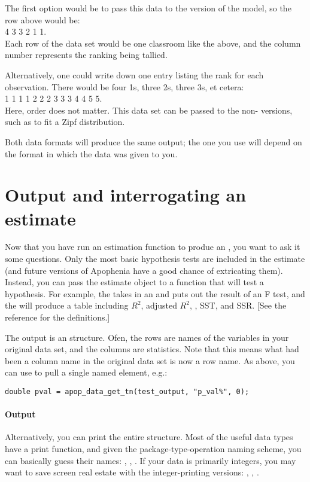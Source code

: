 The first option would be to pass this data to
the  version of the model, so the row above would be:\\
4 3 3 2 1 1.\\
Each row of the data set would be one classroom like the above, and the
column number represents the ranking being tallied.

Alternatively, one could 
write down one entry listing the rank for each observation. There would
be four 1s, three 2s, three 3s, et cetera:\\
1 1 1 1 2 2 2 3 3 3 4 4 5 5.\\
Here, order does not matter.  This data set can be passed to the
non- versions, such as  to fit a
Zipf distribution.

Both data formats will produce the same output; the one you use will
depend on the format in which the data was given to you.




\section{Output and interrogating an estimate}  \label{testoutput}
Now that you have run an estimation function to produe an 
, you want to ask it some questions. Only the most
basic hypothesis tests are included in the estimate (and future versions
of Apophenia have a good chance of extricating them). Instead, you can
pass the estimate object to a function that will test a hypothesis. For
example, the  takes in an 
 and puts out the result of an F test, and the
 will produce a
table including $R^2$, adjusted $R^2$, , SST, and SSR. [See the
reference for the definitions.] 

The output is an  structure. Ofen, the rows are
names of the variables in your original data set, and the columns are
statistics. Note that this means what had been a column name in the 
original data set is now a row name. As above, you can use 
 to pull a single named element, e.g.:
\begin{lstlisting}
double pval = apop_data_get_tn(test_output, "p_val%", 0);
\end{lstlisting}

\paragraph{Output} 
Alternatively, you can print the entire   structure.
Most of the useful data types have
a print function, and given the package-type-operation naming scheme,
you can basically guess their names: ,
, . If your
data is primarily integers, you may want to save screen real estate
with the integer-printing versions: ,
, .

